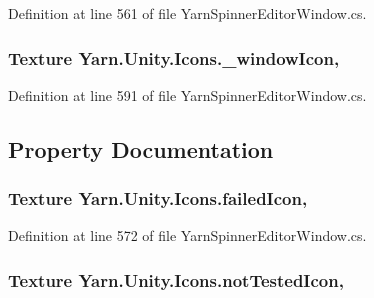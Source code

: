 Definition at line 561 of file Yarn\-Spinner\-Editor\-Window.\-cs.

\hypertarget{a00111_abba8fef6cc12836ea431a8a7c9e2f3db}{
\subsubsection[{\-\_\-window\-Icon}]{\setlength{\rightskip}{0pt plus 5cm}Texture Yarn.\-Unity.\-Icons.\-\_\-window\-Icon\hspace{0.3cm}{\ttfamily [static]}, {\ttfamily [private]}}}\label{a00111_abba8fef6cc12836ea431a8a7c9e2f3db}


Definition at line 591 of file Yarn\-Spinner\-Editor\-Window.\-cs.



\subsection{Property Documentation}
\hypertarget{a00111_aae7cc0e5016db04a90b2aa0e80957626}{
\subsubsection[{failed\-Icon}]{\setlength{\rightskip}{0pt plus 5cm}Texture Yarn.\-Unity.\-Icons.\-failed\-Icon\hspace{0.3cm}{\ttfamily [static]}, {\ttfamily [get]}}}\label{a00111_aae7cc0e5016db04a90b2aa0e80957626}


Definition at line 572 of file Yarn\-Spinner\-Editor\-Window.\-cs.

\hypertarget{a00111_ab8afce565cd2ad1543d1e32e7e589e77}{
\subsubsection[{not\-Tested\-Icon}]{\setlength{\rightskip}{0pt plus 5cm}Texture Yarn.\-Unity.\-Icons.\-not\-Tested\-Icon\hspace{0.3cm}{\ttfamily [static]}, {\ttfamily [get]}}}\label{a00111_ab8afce565cd2ad1543d1e32e7e589e77}


